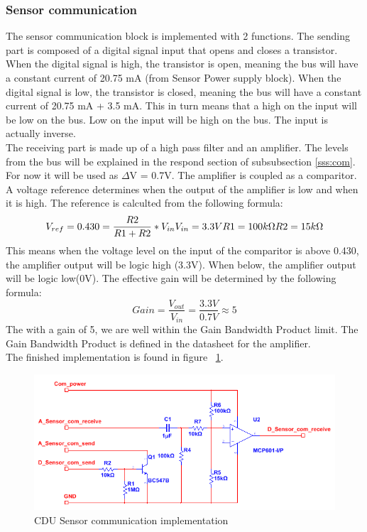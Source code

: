 \subsubsection{Sensor communication}
The sensor communication block is implemented with 2 functions. The sending part is composed of a digital signal input that opens and closes a transistor. When the digital signal is high, the transistor is open, meaning the bus will have a constant current of 20.75 mA (from Sensor Power supply block). When the digital signal is low, the transistor is closed, meaning the bus will have a constant current of 20.75 mA + 3.5 mA. This in turn means that a high on the input will be low on the bus. Low on the input will be high on the bus. The input is actually inverse.\\
The receiving part is made up of a high pass filter and an amplifier. The levels from the bus will be explained in the respond section of subsubsection \ref{sss:com}. For now it will be used as $\Delta$V = 0.7V. The amplifier is coupled as a comparitor. A voltage reference determines when the output of the amplifier is low and when it is high. The reference is calculted from the following formula:
\begin{equation}
	V_{ref} = 0.430 = \frac{R2}{R1+R2} * V_{in} $\\$
	V_{in} = 3.3V $\\$
	R1 = 100k\Omega $\\$
	R2 = 15k\Omega
\end{equation}
This means when the voltage level on the input of the comparitor is above 0.430, the amplifier output will be logic high (3.3V). When below, the amplifier output will be logic low(0V). The effective gain will be determined by the following formula:
\begin{equation}
	Gain = \frac{V_{out}}{V_{in}} = \frac{3.3V}{0.7V} \approx 5 
\end{equation}
The with a gain of 5, we are well within the Gain Bandwidth Product limit. The Gain Bandwidth Product is defined in the datasheet for the amplifier.\\
The finished implementation is found in figure ~\ref{fig:CDUimpsc}.
\begin{figure}[H]
	\centering
	\includegraphics[width=1\textwidth]{billeder/impsc}
	\caption{CDU Sensor communication implementation}
	\label{fig:CDUimpsc}
\end{figure}



